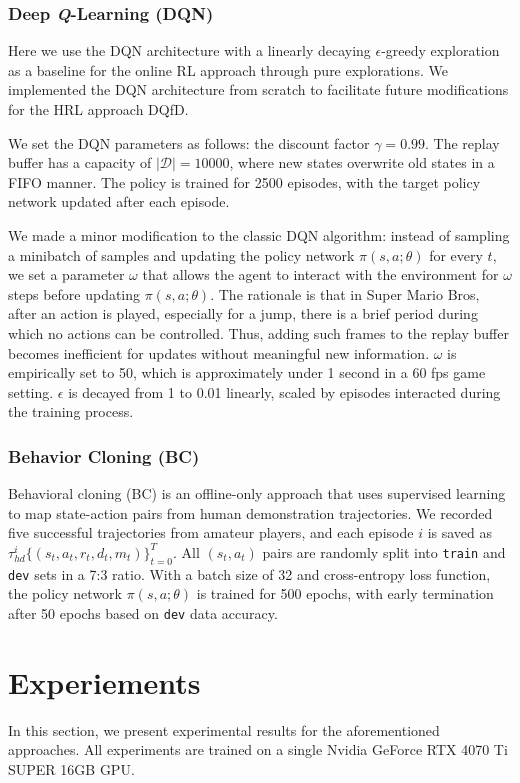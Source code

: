\documentclass{article}
\begin{document}
\subsubsection{Deep \textit{Q}-Learning (DQN)}

Here we use the DQN architecture with a linearly decaying $\epsilon$-greedy 
exploration as a baseline for the online RL approach through pure explorations. 
We implemented the DQN architecture from scratch to facilitate future 
modifications for the HRL approach DQfD.

We set the DQN parameters as follows: the discount factor $\gamma=0.99$. The 
replay buffer has a capacity of $|\mathcal{D}|=10000$, where new states 
overwrite old states in a FIFO manner. The policy is trained for 2500 episodes, 
with the target policy network updated after each episode.

We made a minor modification to the classic DQN algorithm: instead of sampling 
a minibatch of samples and updating the policy network $\pi(s,a;\theta)$ for 
every $t$, we set a parameter $\omega$ that allows the agent to interact with 
the environment for $\omega$ steps before updating $\pi(s,a;\theta)$. The 
rationale is that in Super Mario Bros, after an action is played, especially 
for a jump, there is a brief period during which no actions can be controlled. 
Thus, adding such frames to the replay buffer becomes inefficient for updates 
without meaningful new information. $\omega$ is empirically set to 50, which is 
approximately under 1 second in a 60 fps game setting. $\epsilon$ is decayed 
from 1 to 0.01 linearly, scaled by episodes interacted during the training 
process.

\subsubsection{Behavior Cloning (BC)}
Behavioral cloning (BC) is an offline-only approach that uses supervised 
learning to map state-action pairs from human demonstration trajectories. We 
recorded five successful trajectories from amateur players, and each episode 
$i$ is saved as $\tau_{hd}^{i} \{(s_t, a_t, r_t, d_t, m_t)\}_{t=0}^{T}$. All 
$(s_t, a_t)$ pairs are randomly split into \texttt{train} and \texttt{dev} sets 
in a 7:3 ratio. With a batch size of 32 and cross-entropy loss function, the 
policy network $\pi(s,a;\theta)$ is trained for 500 epochs, with early 
termination after 50 epochs based on \texttt{dev} data accuracy.


\section{Experiements}
In this section, we present experimental results for the aforementioned 
approaches. All experiments are trained on a single Nvidia GeForce RTX 4070 Ti 
SUPER 16GB GPU.
\end{document}
